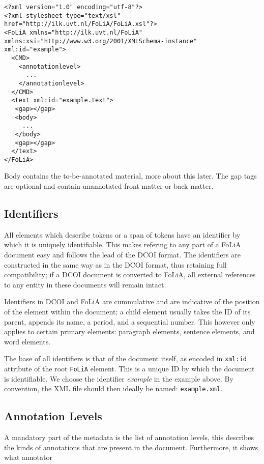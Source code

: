\begin{verbatim}
<?xml version="1.0" encoding="utf-8"?>
<?xml-stylesheet type="text/xsl" href="http://ilk.uvt.nl/FoLiA/FoLiA.xsl"?>
<FoLiA xmlns="http://ilk.uvt.nl/FoLiA" xmlns:xsi="http://www.w3.org/2001/XMLSchema-instance" xml:id="example">
  <CMD> 
    <annotationlevel>
      ...
    </annotationlevel>
  </CMD>  
  <text xml:id="example.text">
   <gap></gap>
   <body>
     ...
   </body>
   <gap></gap>
  </text>
</FoLiA>  
\end{verbatim}

Body contains the to-be-annotated material, more about this later. The gap tags are optional and contain unannotated front matter or back matter.

\subsection{Identifiers}

All elements which describe tokens or a span of tokens have an identifier by which it is uniquely identifiable. This makes refering to any part of a FoLiA document easy and follows the lead of the DCOI format. The identifiers are constructed in the same way as in the DCOI format, thus retaining full compatibility; if a DCOI document is converted to FoLiA, all external references to any entity in these documents will remain intact.

Identifiers in DCOI and FoLiA are cummulative and are indicative of the position of the element within the document; a child element usually takes the ID of its parent, appends its name, a period, and a sequential number. This however only applies to certain primary elements: paragraph elements, sentence elements, and word elements.

The base of all identifiers is that of the document itself, as encoded in \texttt{xml:id} attribute of the root \texttt{FoLiA} element. This is a unique ID by which the document is identifiable. We choose the identifier \emph{example} in the example above. By convention, the XML file should then ideally be named: \texttt{example.xml}.

\subsection{Annotation Levels}

A mandatory part of the metadata is the list of annotation levels, this describes the kinds of annotations that are present in the document. Furthermore, it shows what annotator

